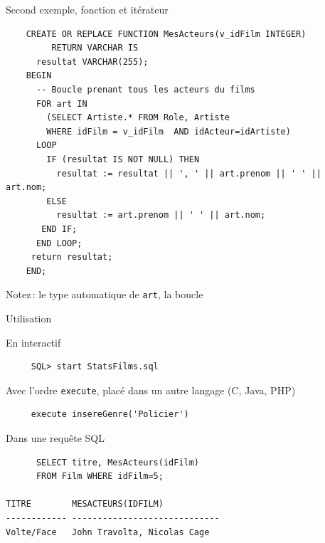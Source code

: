 \begin{frame}[fragile]{Second exemple, fonction et itérateur}

\begin{footnotesize}
\begin{verbatim}
    CREATE OR REPLACE FUNCTION MesActeurs(v_idFilm INTEGER) 
         RETURN VARCHAR IS
      resultat VARCHAR(255);
    BEGIN
      -- Boucle prenant tous les acteurs du films 
      FOR art IN 
        (SELECT Artiste.* FROM Role, Artiste  
        WHERE idFilm = v_idFilm  AND idActeur=idArtiste)
      LOOP
        IF (resultat IS NOT NULL) THEN
          resultat := resultat || ', ' || art.prenom || ' ' || art.nom;
        ELSE   
          resultat := art.prenom || ' ' || art.nom;
       END IF;
      END LOOP;
     return resultat;
    END;
\end{verbatim}
\end{footnotesize}

\vfill
\alert{Notez}\,: le type automatique de \texttt{art}, la boucle

\end{frame}

\begin{frame}[fragile]{Utilisation}

\begin{redbullet}
  \item En interactif
  \begin{verbatim}
     SQL> start StatsFilms.sql
  \end{verbatim}

 \item Avec l'ordre \texttt{execute}, placé dans un autre langage (C, Java, PHP)
 
   \begin{verbatim}
     execute insereGenre('Policier')
  \end{verbatim}
 
 \item Dans une requête SQL
   \begin{verbatim}
      SELECT titre, MesActeurs(idFilm)  
      FROM Film WHERE idFilm=5;

TITRE        MESACTEURS(IDFILM)
------------ -----------------------------
Volte/Face   John Travolta, Nicolas Cage
  \end{verbatim}
 
\end{redbullet}

\end{frame}


